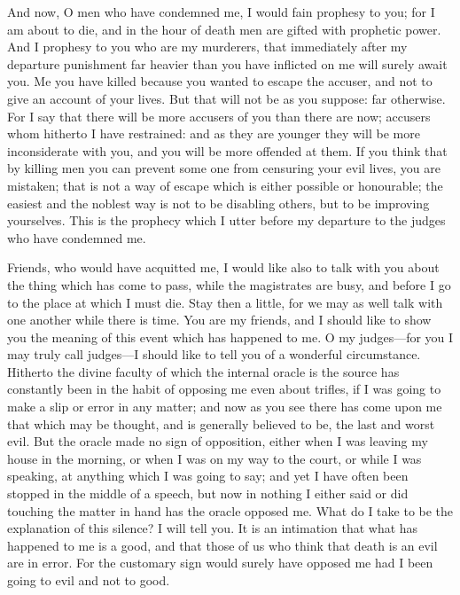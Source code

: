 \documentclass[11pt,letter]{article}
\begin{document}
\par  And now, O men who have condemned me, I would fain prophesy to you; for I am about to die, and in the hour of death men are gifted with prophetic power. And I prophesy to you who are my murderers, that immediately after my departure punishment far heavier than you have inflicted on me will surely await you. Me you have killed because you wanted to escape the accuser, and not to give an account of your lives. But that will not be as you suppose: far otherwise. For I say that there will be more accusers of you than there are now; accusers whom hitherto I have restrained: and as they are younger they will be more inconsiderate with you, and you will be more offended at them. If you think that by killing men you can prevent some one from censuring your evil lives, you are mistaken; that is not a way of escape which is either possible or honourable; the easiest and the noblest way is not to be disabling others, but to be improving yourselves. This is the prophecy which I utter before my departure to the judges who have condemned me.

\par  Friends, who would have acquitted me, I would like also to talk with you about the thing which has come to pass, while the magistrates are busy, and before I go to the place at which I must die. Stay then a little, for we may as well talk with one another while there is time. You are my friends, and I should like to show you the meaning of this event which has happened to me. O my judges—for you I may truly call judges—I should like to tell you of a wonderful circumstance. Hitherto the divine faculty of which the internal oracle is the source has constantly been in the habit of opposing me even about trifles, if I was going to make a slip or error in any matter; and now as you see there has come upon me that which may be thought, and is generally believed to be, the last and worst evil. But the oracle made no sign of opposition, either when I was leaving my house in the morning, or when I was on my way to the court, or while I was speaking, at anything which I was going to say; and yet I have often been stopped in the middle of a speech, but now in nothing I either said or did touching the matter in hand has the oracle opposed me. What do I take to be the explanation of this silence? I will tell you. It is an intimation that what has happened to me is a good, and that those of us who think that death is an evil are in error. For the customary sign would surely have opposed me had I been going to evil and not to good.
\end{document}

